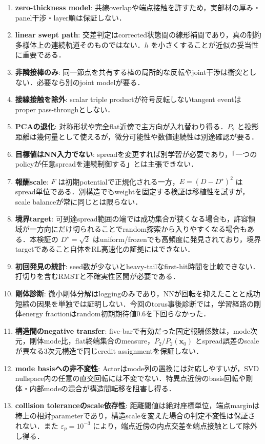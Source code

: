 \documentclass[a4paper,11pt]{ltjsarticle}
\begin{document}
\begin{enumerate}
  \item \textbf{zero-thickness model}: 共線overlapや端点接触を許すため，実部材の厚み・panel干渉・layer順は保証しない．
  \item \textbf{linear swept path}: 交差判定はcorrected状態間の線形補間であり，真の制約多様体上の連続軌道そのものではない．$h$ を小さくすることが近似の妥当性に重要である．
  \item \textbf{非隣接棒のみ}: 同一節点を共有する棒の局所的な反転やjoint干渉は衝突としない．必要なら別のjoint modelが要る．
  \item \textbf{接線接触を除外}: scalar triple productが符号反転しないtangent eventはproper pass-throughとしない．
  \item \textbf{PCAの退化}: 対称形状や完全flat近傍で主方向が入れ替わり得る．$P_2$ と投影距離は幾何量として使えるが，微分可能性や数値連続性は別途確認が要る．
  \item \textbf{目標値はNN入力でない}: spreadを変更すれば別学習が必要であり，「一つのpolicyが任意spreadを連続制御する」とは主張できない．
  \item \textbf{報酬scale}: $F$ は初期potentialで正規化される一方，$E=(D-D^\star)^2$ はspread単位である．別構造でもweightを固定する検証は移植性を試すが，scale balanceが常に同じとは限らない．
  \item \textbf{境界target}: 可到達spread範囲の端では成功集合が狭くなる場合も，許容領域が一方向にだけ切られることでrandom探索から入りやすくなる場合もある．本検証の $D^\star=\sqrt2$ はuniform/frozenでも高頻度に発見されており，境界targetであること自体をRL高速化の証拠にはできない．
  \item \textbf{初回発見の統計}: seed数が少ないとheavy-tailなfirst-hit時間を比較できない．打切りを含むRMSTと不確実性区間が必要である．
  \item \textbf{剛体診断}: 微小剛体分解はloggingのみであり，NNが回転を抑えたことと成功短縮の因果を単独では証明しない．今回のtorus事後診断では，学習経路の剛体energy fractionはrandom初期期待値0.6を下回らなかった．
  \item \textbf{構造間のnegative transfer}: five-barで有効だった固定報酬係数は，mode次元，剛体mode比，flat終端集合のmeasure，$P_2/P_2(\bm x_0)$ とspread誤差のscaleが異なる3次元構造で同じcredit assignmentを保証しない．
  \item \textbf{mode basisへの非不変性}: Actorはmode列の置換には対応しやすいが，SVD nullspace内の任意の直交回転には不変でない．特異点近傍のbasis回転や剛体・内部modeの混合が構造間転移を阻害し得る．
  \item \textbf{collision toleranceのscale依存性}: 距離閾値は絶対座標単位，端点marginは棒上の相対parameterであり，構造scaleを変えた場合の判定不変性は保証されない．また $\varepsilon_p=10^{-3}$ により，端点近傍の内点交差を端点接触として除外し得る．
\end{enumerate}
\end{document}
